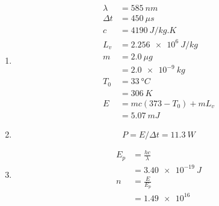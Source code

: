 \documentclass{article}
\begin{document}
\begin{enumerate}
  \item

        \begin{align*}
          \lambda  & = \qty{585}{nm}           \\
          \Delta t & = \qty{450}{\mu s}        \\
          c        & = \qty{4190}{J/kg.K}      \\
          L_v      & = \qty{2.256e6}{J/kg}     \\
          m        & = \qty{2.0}{\mu g}        \\
                   & = \qty{2.0e-9}{kg}        \\
          T_0      & = \qty{33}{\degree C}     \\
                   & = \qty{306}{K}            \\
          E        & = m c (373 - T_0) + m L_v \\
                   & = \qty{5.07}{mJ}
        \end{align*}

  \item \[P = E / \Delta t = \qty{11.3}{W}\]

  \item

        \begin{align*}
          E_p & = \frac{h c}{\lambda} \\
              & = \qty{3.40e-19}{J}   \\
          n   & = \frac{E}{E_p}       \\
              & = \num{1.49e16}
        \end{align*}
\end{enumerate}

\setcounter{subsubsection}{28}
\subsubsection{}
\end{document}

